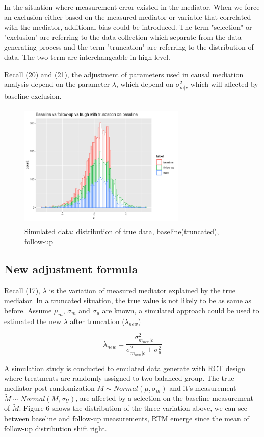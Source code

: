 \documentclass{article}
\begin{document}
In the situation where measurement error existed in the mediator. When we force an exclusion either based on the measured mediator or variable that correlated with the mediator, additional bias could be introduced. The term "selection" or "exclusion" are referring to the data collection which separate from the data generating process and the term "truncation" are referring to the distribution of data. The two term are interchangeable in high-level. \

Recall (20) and (21), the adjustment of parameters used in causal mediation analysis depend on the parameter $\lambda$, which depend on $\sigma^2_{m|c}$ which will affected by baseline exclusion. 



\begin{figure}[h]
\centering
\includegraphics[width = 8cm,height = 6cm]{figure-4.png}
\caption{Simulated data: distribution of true data, baseline(truncated), follow-up }
\label{fig4}
\end{figure}



\subsection{New adjustment formula}

Recall (17), $\lambda$ is the variation of measured mediator explained by the true mediator. In a truncated situation, the true value is not likely to be as same as before. Assume $\mu_m $, $\sigma_m$ and $\sigma_u$ are known, a simulated approach could be used to estimated the new $\lambda$ after truncation ($\lambda_{new}$)

\begin{equation}
\lambda_{new} = \frac{\sigma_{m_{new}|c}^2}{\sigma_{m_{new}|c}^2 + \sigma_{u}^2}
\end{equation}


A simulation study is conducted to emulated data generate with RCT design where treatments are randomly assigned to two balanced group.  The true mediator post-randomization $M \sim Normal (\mu, \sigma_{m}) $ and it's measurement $\tilde M \sim Normal (M, \sigma_U)$, are affected by a selection on the baseline measurement of $\tilde M$. Figure-6 shows the distribution of the three variation above, we can see between baseline and follow-up measurements, RTM emerge since the mean of follow-up distribution shift right. 
\end{document}
